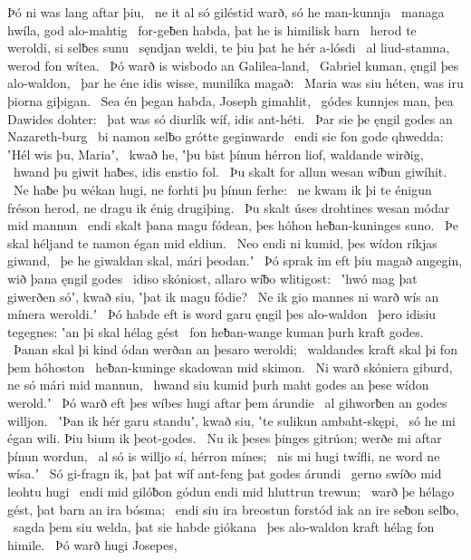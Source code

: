 Þó ni was lang aftar þiu, \hld\ ne it al só giléstid warð,
só he man-kunnja \hld\ managa hwíla,
god alo-mahtig \hld\ for-geƀen habda,
þat he is himilisk barn \hld\ herod te weroldi,
si selƀes sunu \hld\ sęndjan weldi,
te þiu þat he hér a-lósdi \hld\ al liud-stamna,
werod fon wítea. \hld\ Þó warð is wisbodo
an Galilea-land, \hld\ Gabriel kuman,
ęngil þes alo-waldon, \hld\ þar he éne idis wisse,
munilíka magað: \hld\ Maria was siu héten,
was iru þiorna giþigan. \hld\ Sea én þegan habda,
Joseph gimahlit, \hld\ gódes kunnjes man,
þea Dawides dohter: \hld\ þat was só diurlík wíf,
idis ant-héti. \hld\ Þar sie þe ęngil godes
an Nazareth-burg \hld\ bi namon selƀo
grótte geginwarde \hld\ endi sie fon gode qhwedda:
ʽHél wis þu, Mariaʼ, \hld\ kwað he, ʽþu bist þínun hérron liof,
waldande wirðig, \hld\ hwand þu giwit haƀes,
idis enstio fol. \hld\ Þu skalt for allun wesan
wíƀun giwíhit. \hld\ Ne haƀe þu wékan hugi,
ne forhti þu þínun ferhe: \hld\ ne kwam ik þi te énigun fréson herod,
ne dragu ik énig drugiþing. \hld\ Þu skalt úses drohtines wesan
módar mid mannun \hld\ endi skalt þana magu fódean,
þes hóhon heƀan-kuninges suno. \hld\ Þe skal héljand te namon
égan mid eldiun. \hld\ Neo endi ni kumid,
þes wídon ríkjas giwand, \hld\ þe he giwaldan skal,
mári þeodan.ʼ \hld\ Þó sprak im eft þiu magað angegin,
wið þana ęngil godes \hld\ idiso skóniost,
allaro wíƀo wlitigost: \hld\ ʽhwó mag þat giwerðen sóʼ, kwað siu,
ʽþat ik magu fódie? \hld\ Ne ik gio mannes ni warð
wís an mínera weroldi.ʼ \hld\ Þó habde eft is word garu
ęngil þes alo-waldon \hld\ þero idisiu tegegnes:
ʽan þi skal hélag gést \hld\ fon heƀan-wange
kuman þurh kraft godes. \hld\ Þanan skal þi kind ódan
werðan an þesaro weroldi; \hld\ waldandes kraft
skal þi fon þem hóhoston \hld\ heƀan-kuninge
skadowan mid skimon. \hld\ Ni warð skóniera giburd,
ne só mári mid mannun, \hld\ hwand siu kumid þurh maht godes
an þese wídon werold.ʼ \hld\ Þó warð eft þes wíbes hugi
aftar þem árundie \hld\ al gihworƀen
an godes willjon. \hld\ ʽÞan ik hér garu standuʼ, kwað siu,
ʽte sulikun ambaht-skępi, \hld\ só he mi égan wili.
Þiu bium ik þeot-godes. \hld\ Nu ik þeses þinges gitrúon;
werðe mi aftar þínun wordun, \hld\ al só is willjo sí,
hérron mínes; \hld\ nis mi hugi twífli,
ne word ne wísa.ʼ \hld\ Só gi-fragn ik, þat þat wíf ant-feng
þat godes árundi \hld\ gerno swíðo
mid leohtu hugi \hld\ endi mid gilóƀon gódun
endi mid hluttrun trewun; \hld\ warð þe hélago gést,
þat barn an ira bósma; \hld\ endi siu ira breostun forstód
iak an ire seƀon selƀo, \hld\ sagda þem siu welda,
þat sie habde giókana \hld\ þes alo-waldon kraft
hélag fon himile. \hld\ Þó warð hugi Josepes,
